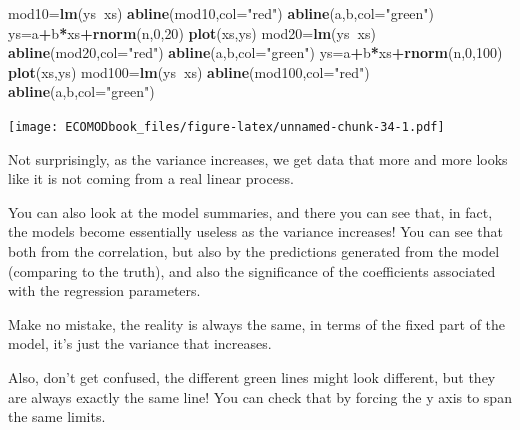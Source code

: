 \documentclass[
]{book}
\newenvironment{Shaded}{\begin{snugshade}}{\end{snugshade}}
\newcommand{\DataTypeTok}[1]{\textcolor[rgb]{0.13,0.29,0.53}{#1}}
\newcommand{\DecValTok}[1]{\textcolor[rgb]{0.00,0.00,0.81}{#1}}
\newcommand{\KeywordTok}[1]{\textcolor[rgb]{0.13,0.29,0.53}{\textbf{#1}}}
\newcommand{\NormalTok}[1]{#1}
\newcommand{\OperatorTok}[1]{\textcolor[rgb]{0.81,0.36,0.00}{\textbf{#1}}}
\newcommand{\StringTok}[1]{\textcolor[rgb]{0.31,0.60,0.02}{#1}}
\begin{document}
\begin{Shaded}
\begin{Highlighting}[]
\NormalTok{mod10=}\KeywordTok{lm}\NormalTok{(ys}\OperatorTok{~}\NormalTok{xs)}
\KeywordTok{abline}\NormalTok{(mod10,}\DataTypeTok{col=}\StringTok{"red"}\NormalTok{)}
\KeywordTok{abline}\NormalTok{(a,b,}\DataTypeTok{col=}\StringTok{"green"}\NormalTok{)}
\NormalTok{ys=a}\OperatorTok{+}\NormalTok{b}\OperatorTok{*}\NormalTok{xs}\OperatorTok{+}\KeywordTok{rnorm}\NormalTok{(n,}\DecValTok{0}\NormalTok{,}\DecValTok{20}\NormalTok{)}
\KeywordTok{plot}\NormalTok{(xs,ys)}
\NormalTok{mod20=}\KeywordTok{lm}\NormalTok{(ys}\OperatorTok{~}\NormalTok{xs)}
\KeywordTok{abline}\NormalTok{(mod20,}\DataTypeTok{col=}\StringTok{"red"}\NormalTok{)}
\KeywordTok{abline}\NormalTok{(a,b,}\DataTypeTok{col=}\StringTok{"green"}\NormalTok{)}
\NormalTok{ys=a}\OperatorTok{+}\NormalTok{b}\OperatorTok{*}\NormalTok{xs}\OperatorTok{+}\KeywordTok{rnorm}\NormalTok{(n,}\DecValTok{0}\NormalTok{,}\DecValTok{100}\NormalTok{)}
\KeywordTok{plot}\NormalTok{(xs,ys)}
\NormalTok{mod100=}\KeywordTok{lm}\NormalTok{(ys}\OperatorTok{~}\NormalTok{xs)}
\KeywordTok{abline}\NormalTok{(mod100,}\DataTypeTok{col=}\StringTok{"red"}\NormalTok{)}
\KeywordTok{abline}\NormalTok{(a,b,}\DataTypeTok{col=}\StringTok{"green"}\NormalTok{)}
\end{Highlighting}
\end{Shaded}

\texttt{[image: ECOMODbook\_files/figure-latex/unnamed-chunk-34-1.pdf]}

Not surprisingly, as the variance increases, we get data that more and more looks like it is not coming from a real linear process.

You can also look at the model summaries, and there you can see that, in fact, the models become essentially useless as the variance increases! You can see that both from the correlation, but also by the predictions generated from the model (comparing to the truth), and also the significance of the coefficients associated with the regression parameters.

Make no mistake, the reality is always the same, in terms of the fixed part of the model, it's just the variance that increases.

Also, don't get confused, the different green lines might look different, but they are always exactly the same line! You can check that by forcing the y axis to span the same limits.
\end{document}
